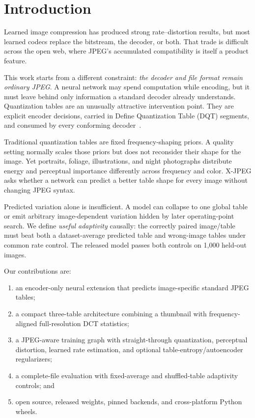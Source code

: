 \documentclass[10pt,twocolumn]{article}
\newcommand{\xjpeg}{X-JPEG}
\begin{document}
\section{Introduction}

Learned image compression has produced strong rate--distortion results, but most learned codecs replace the bitstream, the decoder, or both. That trade is difficult across the open web, where JPEG's accumulated compatibility is itself a product feature.

This work starts from a different constraint: \emph{the decoder and file format remain ordinary JPEG}. A neural network may spend computation while encoding, but it must leave behind only information a standard decoder already understands. Quantization tables are an unusually attractive intervention point. They are explicit encoder decisions, carried in Define Quantization Table (DQT) segments, and consumed by every conforming decoder~\cite{itu1992jpeg,wallace1992jpeg}.

Traditional quantization tables are fixed frequency-shaping priors. A quality setting normally scales those priors but does not reconsider their shape for the image. Yet portraits, foliage, illustrations, and night photographs distribute energy and perceptual importance differently across frequency and color. \xjpeg{} asks whether a network can predict a better table shape for every image without changing JPEG syntax.

Predicted variation alone is insufficient. A model can collapse to one global table or emit arbitrary image-dependent variation hidden by later operating-point search. We define \emph{useful adaptivity} causally: the correctly paired image/table must beat both a dataset-average predicted table and wrong-image tables under common rate control. The released model passes both controls on 1,000 held-out images.

Our contributions are:
\begin{enumerate}
  \item an encoder-only neural extension that predicts image-specific standard JPEG tables;
  \item a compact three-table architecture combining a thumbnail with frequency-aligned full-resolution DCT statistics;
  \item a JPEG-aware training graph with straight-through quantization, perceptual distortion, learned rate estimation, and optional table-entropy/autoencoder regularizers;
  \item a complete-file evaluation with fixed-average and shuffled-table adaptivity controls; and
  \item open source, released weights, pinned backends, and cross-platform Python wheels.
\end{enumerate}
\end{document}
